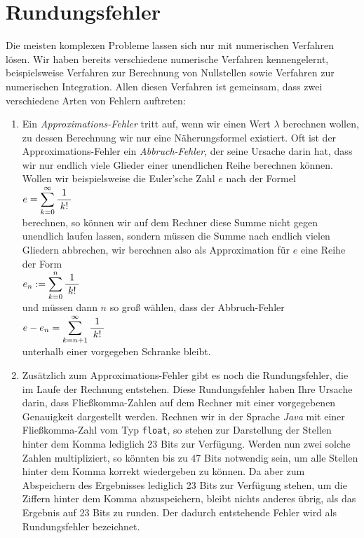 \chapter{Rundungsfehler}
Die meisten komplexen Probleme lassen sich nur mit numerischen Verfahren l\"osen.  Wir haben
bereits verschiedene numerische Verfahren kennengelernt, beispielsweise Verfahren zur
Berechnung von Nullstellen sowie Verfahren zur numerischen Integration.  Allen diesen
Verfahren ist gemeinsam, dass zwei verschiedene Arten von Fehlern auftreten:
\begin{enumerate}
\item Ein \emph{Approximations-Fehler} tritt auf, wenn wir einen Wert $\lambda$ berechnen
      wollen, zu dessen Berechnung wir nur eine N\"aherungsformel existiert.  Oft ist der
      Approximations-Fehler ein \emph{Abbruch-Fehler}, der seine
      Ursache darin hat, dass wir nur endlich viele Glieder einer unendlichen Reihe
      berechnen k\"onnen.  Wollen wir beispielsweise die Euler'sche Zahl $e$ nach der Formel
      \\[0.2cm]
      \hspace*{1.3cm}
      $\displaystyle e = \sum\limits_{k=0}^\infty \displaystyle\frac{\;\displaystyle1\;}{\;\displaystyle k!\;}$
      \\[0.2cm]
      berechnen, so k\"onnen wir auf dem Rechner diese Summe nicht gegen unendlich laufen
      lassen, sondern m\"ussen die Summe nach endlich vielen Gliedern abbrechen, wir berechnen
      also als Approximation f\"ur $e$ eine Reihe der Form
      \\[0.2cm]
      \hspace*{1.3cm}
      $\displaystyle e_n := \sum\limits_{k=0}^n \displaystyle\frac{\;\displaystyle1\;}{\;\displaystyle k!\;}$ 
      \\[0.2cm]
      und m\"ussen dann $n$ so gro{\ss} w\"ahlen, dass der Abbruch-Fehler
      \\[0.2cm]
      \hspace*{1.3cm}
      $\displaystyle e - e_n = \sum\limits_{k=n+1}^\infty \displaystyle\frac{\;\displaystyle1\;}{\;\displaystyle k!\;}$ 
      \\[0.2cm]
      unterhalb einer vorgegeben Schranke bleibt.
\item Zus\"atzlich zum Approximations-Fehler gibt es noch die Rundungsfehler, die im Laufe der Rechnung 
      entstehen.  Diese Rundungsfehler haben Ihre Ursache darin, dass Flie{\ss}komma-Zahlen auf dem Rechner 
      mit einer vorgegebenen Genauigkeit dargestellt werden.  Rechnen wir in der Sprache \textsl{Java}
      mit einer Flie{\ss}komma-Zahl vom Typ \texttt{float}, so stehen zur Darstellung der Stellen hinter dem
      Komma lediglich 23 Bits zur Verf\"ugung.  Werden nun zwei solche Zahlen multipliziert, so k\"onnten
      bis zu 47 Bits notwendig sein, um alle Stellen hinter dem Komma korrekt wiedergeben zu k\"onnen.
      Da aber zum Abspeichern des Ergebnisses lediglich 23 Bits zur Verf\"ugung stehen, um die Ziffern 
      hinter dem Komma abzuspeichern, bleibt nichts anderes \"ubrig, als das Ergebnis auf 23 Bits zu
      runden.  Der dadurch entstehende Fehler wird als Rundungsfehler bezeichnet.
\end{enumerate}
